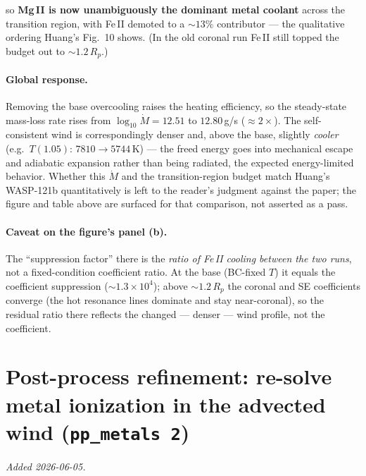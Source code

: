 \documentclass[english,a4paper]{kiseon_memo}
\begin{document}
so \textbf{Mg\,II is now unambiguously the dominant metal coolant} across the
transition region, with Fe\,II demoted to a \(\sim13\%\) contributor --- the
qualitative ordering Huang's Fig.~10 shows. (In the old coronal run Fe\,II still
topped the budget out to \(\sim1.2\,R_p\).)

\paragraph{Global response.}
Removing the base overcooling raises the heating efficiency, so the steady-state
mass-loss rate rises from \(\log_{10}\dot{M} = 12.51\) to \(\mathbf{12.80}\,\)g/s
(\(\approx2\times\)). The self-consistent wind is correspondingly denser and,
above the base, slightly \emph{cooler} (e.g.\ \(T(1.05)\): \(7810 \rightarrow
5744\,\)K) --- the freed energy goes into mechanical escape and adiabatic
expansion rather than being radiated, the expected energy-limited behavior.
Whether this \(\dot{M}\) and the transition-region budget match Huang's
WASP-121b quantitatively is left to the reader's judgment against the paper; the
figure and table above are surfaced for that comparison, not asserted as a pass.

\paragraph{Caveat on the figure's panel (b).}
The ``suppression factor'' there is the \emph{ratio of Fe\,II cooling between the
two runs}, not a fixed-condition coefficient ratio. At the base (BC-fixed \(T\))
it equals the coefficient suppression (\(\sim1.3\!\times\!10^4\)); above
\(\sim1.2\,R_p\) the coronal and SE coefficients converge (the hot resonance
lines dominate and stay near-coronal), so the residual ratio there reflects the
changed --- denser --- wind profile, not the coefficient.

\section{Post-process refinement: re-solve metal ionization in the advected wind (\texttt{pp\_metals 2})}

\emph{Added 2026-06-05.}
\end{document}
